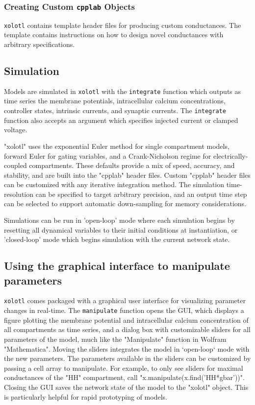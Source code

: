 \documentclass{frontiersSCNS} %
\begin{document}
\subsubsection{Creating Custom \texttt{cpplab} Objects}

\texttt{xolotl} contains template header files for producing custom conductances. The template contains instructions on how to design novel conductances with arbitrary specifications.

\subsection{Simulation}

Models are simulated in \texttt{xolotl} with the \texttt{integrate} function which outputs as time series the membrane potentials, intracellular calcium concentrations, controller states, intrinsic currents, and synaptic currents. The \texttt{integrate} function also accepts an argument which specifies injected current or clamped voltage. 

"xolotl" uses the exponential Euler method for single compartment models, forward Euler for gating variables, and a Crank-Nicholson regime for electrically-coupled compartments. These defaults provide a mix of speed, accuracy, and stability, and are built into the "cpplab" header files. Custom "cpplab" header files can be customized with any iterative integration method. The simulation time-resolution can be specified to target arbitrary precision, and an output time step can be selected to support automatic down-sampling for memory considerations.

Simulations can be run in 'open-loop' mode where each simulation begins by resetting all dynamical variables to their initial conditions at instantiation, or 'closed-loop' mode which begins simulation with the current network state.

\subsection{Using the graphical interface to manipulate parameters}

\texttt{xolotl} comes packaged with a graphical user interface for visualizing parameter changes in real-time. The \texttt{manipulate} function opens the GUI, which displays a figure plotting the membrane potential and intracellular calcium concentration of all compartments as time series, and a dialog box with customizable sliders for all parameters of the model, much like the "Manipulate" function in Wolfram "Mathematica". Moving the sliders integrates the model in `open-loop` mode with the new parameters. The parameters available in the sliders can be customized by passing a cell array to manipulate. For example, to only see sliders for maximal conductances of the "HH" compartment, call "x.manipulate(x.find('HH*gbar'))". Closing the GUI saves the network state of the model to the "xolotl" object. This is particularly helpful for rapid prototyping of models.
\end{document}
